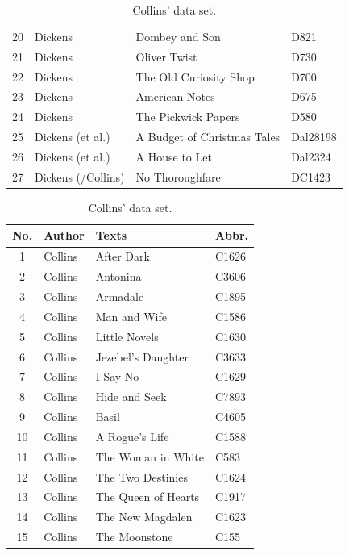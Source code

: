 \documentclass[a4paper,10pt,twoside,fleqn]{article}
\begin{document}
\begin{table}
\begin{minipage}{.62\linewidth}
\begin{tabular}{c l l l}
20		& Dickens		& Dombey and Son			& D821     \\
21		& Dickens		& Oliver Twist				& D730        \\
22		& Dickens		&The Old Curiosity Shop			& D700         \\
23		& Dickens		& American Notes			& D675         \\
24		& Dickens		&The Pickwick Papers			& D580           \\
25		& Dickens     (et al.)  & A Budget of Christmas Tales		& Dal28198         \\
26		& Dickens (et al.)	& A House to Let			& Dal2324     \\
27		& Dickens (/Collins)     & No Thoroughfare			& DC1423       \\ \bottomrule
\end{tabular}
\end{minipage}%
\hfill
    \begin{minipage}{.62\linewidth}
      \centering
      \caption{Collins' data set.} %
\label{table:Collins-data}
\begin{tabular}{c l l l } \\\hline \hline
\textbf{No.}	& \textbf{Author} 		& \textbf{Texts} 		& \textbf{Abbr.} \\ \hline
1		& Collins       		& After Dark			& C1626    \\
2		& Collins			& Antonina			& C3606        \\
3		& Collins			& Armadale			& C1895  \\
4		& Collins			& Man and Wife			& C1586      \\
5		& Collins			& Little Novels			& C1630    \\
6		& Collins			& Jezebel's Daughter		& C3633    \\
7		& Collins			& I Say No			& C1629       \\
8		& Collins			& Hide and Seek			& C7893  \\
9		& Collins			& Basil				& C4605 \\
10		& Collins			& A Rogue's Life		& C1588     \\
11		& Collins			& The Woman in White		& C583         \\
12		& Collins			& The Two Destinies		& C1624    \\
13		& Collins			& The Queen of Hearts		& C1917        \\
14		& Collins			& The New Magdalen		& C1623     \\
15		& Collins			& The Moonstone			& C155         \\

\end{tabular}
\end{minipage}
\end{table}
\end{document}
